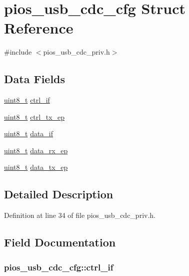 \hypertarget{structpios__usb__cdc__cfg}{\section{pios\-\_\-usb\-\_\-cdc\-\_\-cfg Struct Reference}
\label{structpios__usb__cdc__cfg}
}


{\ttfamily \#include $<$pios\-\_\-usb\-\_\-cdc\-\_\-priv.\-h$>$}

\subsection*{Data Fields}
\begin{DoxyCompactItemize}
\item 
\hyperlink{stdint_8h_aba7bc1797add20fe3efdf37ced1182c5}{uint8\-\_\-t} \hyperlink{structpios__usb__cdc__cfg_a2a35b38ff91a638b973191977eab30e1}{ctrl\-\_\-if}
\item 
\hyperlink{stdint_8h_aba7bc1797add20fe3efdf37ced1182c5}{uint8\-\_\-t} \hyperlink{structpios__usb__cdc__cfg_a66e87c604aa767dc74141a0b7e7e3b7f}{ctrl\-\_\-tx\-\_\-ep}
\item 
\hyperlink{stdint_8h_aba7bc1797add20fe3efdf37ced1182c5}{uint8\-\_\-t} \hyperlink{structpios__usb__cdc__cfg_a6812747b57d5aa880ba1c3bde8f6333c}{data\-\_\-if}
\item 
\hyperlink{stdint_8h_aba7bc1797add20fe3efdf37ced1182c5}{uint8\-\_\-t} \hyperlink{structpios__usb__cdc__cfg_a93c34c9365c4f3593572f3c75039dc3c}{data\-\_\-rx\-\_\-ep}
\item 
\hyperlink{stdint_8h_aba7bc1797add20fe3efdf37ced1182c5}{uint8\-\_\-t} \hyperlink{structpios__usb__cdc__cfg_a00440e0eaec6a2c120fd8909599e8f61}{data\-\_\-tx\-\_\-ep}
\end{DoxyCompactItemize}


\subsection{Detailed Description}


Definition at line 34 of file pios\-\_\-usb\-\_\-cdc\-\_\-priv.\-h.



\subsection{Field Documentation}
\hypertarget{structpios__usb__cdc__cfg_a2a35b38ff91a638b973191977eab30e1}{
\subsubsection[{ctrl\-\_\-if}]{ pios\-\_\-usb\-\_\-cdc\-\_\-cfg\-::ctrl\-\_\-if}}\label{structpios__usb__cdc__cfg_a2a35b38ff91a638b973191977eab30e1}


